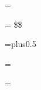 \def\rcsid$#1${\rcstrue\rcstoks={#1}}

\def\rcstag{\ifrcs \tensf\$\the\rcstoks\$\fi}

\headline={\ifblank\hfil\else\iftitle\hfil\else
  \ifodd\pageno\rightheadline\else\leftheadline\fi\fi\fi}

\footline={\ifblank
    \hfil
  \else\iftitle
    \ifodd\pageno\rightnumfoot\else\leftnumfoot\fi
  \else
    \rcstag\hfil
  \fi\fi}

\def\leftheadline{\tenit\thepageno\quad\lhead\hfill}
\def\rightheadline{\hfill\tenit\rhead\quad\thepageno}

\def\leftnumfoot{\tenit\thepageno\hfil\rcstag}
\def\rightnumfoot{\rcstag\hfil\tenit\thepageno}

\def\lhead{} %
\def\rhead{\firstmark} %

\def\thepageno{\folio}


%
%

\skip\footins=\grid plus0.5\grid
\dimen{}\grid
\count{}

\def\footnote{\fnmark\fntext}

\def\fnmark{\edef\@sf{\spacefactor\the\spacefactor}%
  \global\advance\footcnt by1
  \hyperanchor@\fntag{fn}%
  \hyperlink{\fntag a}{$^{\number\footcnt}$}\@sf}

\def\fntext{\insert\footins\bgroup\eightpoint
  \interlinepenalty=\interfootnotelinepenalty
  \let\par=\endgraf
  \leftskip=0pt \rightskip=0pt
  \splittopskip=\ht\strutbox %
  \splitmaxdepth=\dp\strutbox \floatingpenalty=20000
  \noindent 
  \hyperanchor{\fntag a}\hyperlink\fntag{$^{\number\footcnt}$}\enspace
  \bgroup\strut
  \aftergroup\@foot\let\next}
\def\@foot{\strut\egroup}


%
% 

\newinsert\margin
\dimen\margin=\maxdimen \count{} \skip\margin=0pt

\newbox\preambox \setbox\preambox=\vbox{}
\def\preamble#1{\global\setbox\preambox=\vbox{\unvbox\preambox#1}}
\def\dopreamble{\unvbox\preambox \global\let\dopreamble=\relax}

